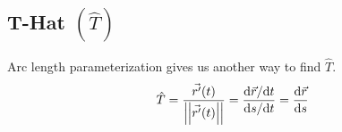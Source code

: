 \subsection{T-Hat $\left(\hat{T}\right)$}
Arc length parameterization gives us another way to find $\hat{T}$.\\
$$\hat{T}=\frac{\vec{r^\prime}(t)}{\left|\left|\vec{r^\prime}(t)\right|\right|}=\frac{\mathrm{d}\vec{r}/\mathrm{d}t}{\mathrm{d}s/\mathrm{d}t}=\frac{\mathrm{d}\vec{r}}{\mathrm{d}s}$$